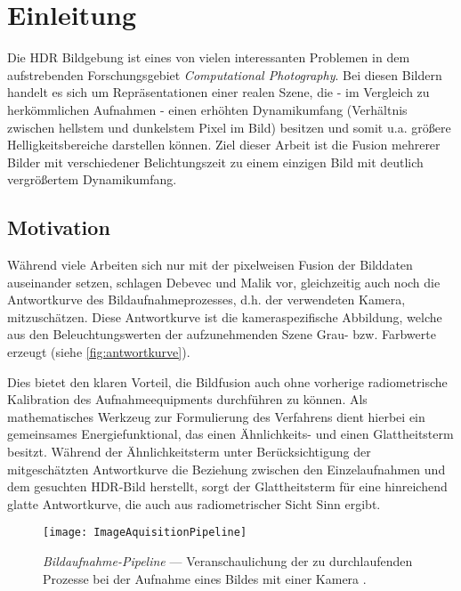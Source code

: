 \glsresetall


\chapter{Einleitung}
Die \gls{HDR} Bildgebung ist eines von vielen interessanten Problemen in dem aufstrebenden Forschungsgebiet \textit{Computational Photography}. Bei diesen Bildern handelt es sich um Repräsentationen einer realen Szene, die - im Vergleich zu herkömmlichen Aufnahmen - einen erhöhten Dynamikumfang (Verhältnis zwischen hellstem und dunkelstem Pixel im Bild) besitzen und somit u.a. größere Helligkeitsbereiche darstellen können. Ziel dieser Arbeit ist die Fusion mehrerer Bilder mit verschiedener Belichtungszeit zu einem einzigen Bild mit deutlich vergrößertem Dynamikumfang.
 
\section{Motivation}


Während viele Arbeiten sich nur mit der pixelweisen Fusion der Bilddaten auseinander setzen, schlagen Debevec und Malik \cite{paper} vor, gleichzeitig auch noch die Antwortkurve des Bildaufnahmeprozesses, d.h. der verwendeten Kamera, mitzuschätzen. Diese Antwortkurve ist die kameraspezifische Abbildung, welche aus den Beleuchtungswerten der aufzunehmenden Szene Grau- bzw. Farbwerte erzeugt (siehe \autoref{fig:antwortkurve}).

Dies bietet den klaren Vorteil, die Bildfusion auch ohne vorherige radiometrische Kalibration des Aufnahmeequipments durchführen zu können. Als mathematisches Werkzeug zur Formulierung des Verfahrens dient hierbei ein gemeinsames Energiefunktional, das einen Ähnlichkeits- und einen  Glattheitsterm besitzt. Während der Ähnlichkeitsterm unter Berücksichtigung der mitgeschätzten Antwortkurve die Beziehung zwischen den Einzelaufnahmen und dem gesuchten HDR-Bild herstellt, sorgt der Glattheitsterm für eine hinreichend glatte Antwortkurve, die auch aus radiometrischer Sicht Sinn ergibt.

\begin{figure}
  \begin{center}
    \texttt{[image: ImageAquisitionPipeline]}
    \caption{\textit{Bildaufnahme-Pipeline} --- Veranschaulichung der zu durchlaufenden Prozesse bei der Aufnahme eines Bildes mit einer Kamera  \cite[S.2]{paper}.}
    \label{fig:antwortkurve}
  \end{center}
\end{figure}

